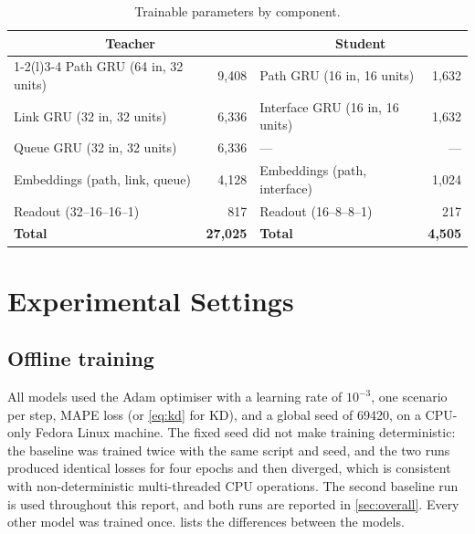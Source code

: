 \begin{table}[ht]
\centering
\small
\caption{Trainable parameters by component.}
\label{tab:params}
\begin{tabular}{@{}l r l r@{}}
\toprule
\multicolumn{2}{c}{\textbf{Teacher}} & \multicolumn{2}{c}{\textbf{Student}} \\
\cmidrule(r){1-2}\cmidrule(l){3-4}
Path GRU (64 in, 32 units)  & 9,408 & Path GRU (16 in, 16 units)       & 1,632 \\
Link GRU (32 in, 32 units)  & 6,336 & Interface GRU (16 in, 16 units)  & 1,632 \\
Queue GRU (32 in, 32 units) & 6,336 & ---                              & --- \\
Embeddings (path, link, queue) & 4,128 & Embeddings (path, interface) & 1,024 \\
Readout (32--16--16--1)     & 817   & Readout (16--8--8--1)            & 217 \\
\midrule
\textbf{Total}              & \textbf{27,025} & \textbf{Total}         & \textbf{4,505} \\
\bottomrule
\end{tabular}
\end{table}

\section{Experimental Settings}
\label{sec:settings}

\subsection{Offline training}

All models used the Adam optimiser \cite{kingma2015adam} with a learning rate of $10^{-3}$, one scenario per step, MAPE loss (or \cref{eq:kd} for KD), and a global seed of 69420, on a CPU-only Fedora Linux machine. The fixed seed did not make training deterministic: the baseline was trained twice with the same script and seed, and the two runs produced identical losses for four epochs and then diverged, which is consistent with non-deterministic multi-threaded CPU operations. The second baseline run is used throughout this report, and both runs are reported in \cref{sec:overall}. Every other model was trained once.  lists the differences between the models.

